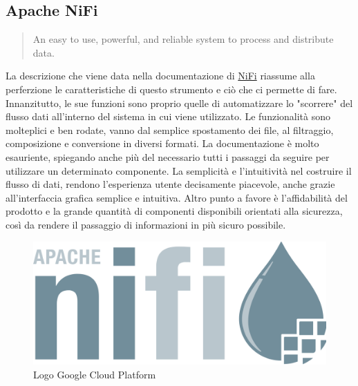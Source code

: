 \subsection{Apache NiFi}
\begin{quotation}
An easy to use, powerful, and reliable system to process and distribute data.
\end{quotation}
La descrizione che viene data nella documentazione di \href{https://nifi.apache.org/docs/nifi-docs/html/getting-started.html}{NiFi} riassume alla perferzione le caratteristiche di questo strumento e ciò che ci permette di fare.
\\Innanzitutto, le sue funzioni sono proprio quelle di automatizzare lo "scorrere" del flusso dati all'interno del sistema in cui viene utilizzato. Le funzionalità sono molteplici e ben rodate, vanno dal semplice spostamento dei file, al filtraggio, composizione e conversione in diversi formati. La documentazione è molto esauriente, spiegando anche più del necessario tutti i passaggi da seguire per utilizzare un determinato componente. La semplicità e l'intuitività nel costruire il flusso di dati, rendono l'esperienza utente decisamente piacevole, anche grazie all'interfaccia grafica semplice e intuitiva. Altro punto a favore è l'affidabilità del prodotto e la grande quantità di componenti disponibili orientati alla sicurezza, così da rendere il passaggio di informazioni in più sicuro possibile.
\begin{figure}[h!]
	\centering
	\includegraphics[scale=0.1]{figures/apache-nifi-logo}
	\caption[Logo Google Cloud Platform.]{Logo Google Cloud Platform
		\label{fig:logoGCP}}
\end{figure}	
